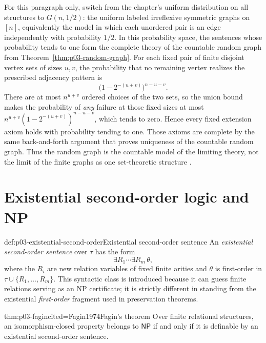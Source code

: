For this paragraph only, switch from the chapter's uniform distribution on
all structures to \(G(n,1/2)\): the uniform labeled irreflexive symmetric
graphs on \([n]\), equivalently the model in which each unordered pair is an
edge independently with probability \(1/2\).  In this probability space, the
sentences whose probability tends to one form the complete theory of the
countable random graph from
Theorem~\ref{thm:p03-random-graph}.  For each fixed pair of finite disjoint
vertex sets of sizes \(u,v\), the probability that no remaining vertex
realizes the prescribed adjacency pattern is
\[
 \bigl(1-2^{-(u+v)}\bigr)^{n-u-v}.
\]
There are at most \(n^{u+v}\) ordered choices of the two sets, so the union
bound makes the probability of \emph{any} failure at those fixed sizes at
most
\(n^{u+v}(1-2^{-(u+v)})^{n-u-v}\), which tends to zero.  Hence every fixed
extension axiom holds with probability tending to one.  Those axioms are complete by the same
back-and-forth argument that proves uniqueness of the countable random graph.
Thus the random graph is the countable model of the limiting theory, not the
limit of the finite graphs as one set-theoretic structure
\cite{GlebskiiEtAl1969,Fagin1976,Rado1964}.

\section{Existential second-order logic and NP}
\label{sec:p03-fagin-theorem}

\begin{hbdefinition}{def:p03-existential-second-order}{Existential second-order sentence}
An \emph{existential second-order sentence} over \(\tau\) has the form
\[
  \exists R_1\cdots\exists R_m\,\theta,
\]
where the \(R_i\) are new relation variables of fixed finite arities and
\(\theta\) is first-order in \(\tau\cup\{R_1,\ldots,R_m\}\).  This syntactic
class is introduced because it can guess finite relations serving as an NP
certificate; it is strictly different in standing from the existential
\emph{first-order} fragment used in preservation theorems.
\end{hbdefinition}

\begin{hbtheorem}{thm:p03-fagin}{cited=Fagin1974}{Fagin's theorem}
Over finite relational structures, an isomorphism-closed property belongs to
\(\mathsf{NP}\) if and only if it is definable by an existential second-order
sentence.
\end{hbtheorem}

